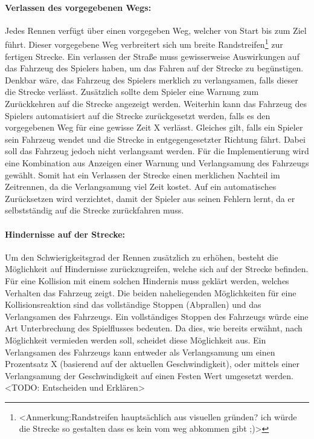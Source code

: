 		\paragraph{Verlassen des vorgegebenen Wegs:}
		Jedes Rennen verfügt über einen vorgegeben Weg, welcher von Start bis zum Ziel führt. Dieser vorgegebene Weg verbreitert sich um breite Randstreifen\footnote{<Anmerkung:Randstreifen hauptsächlich aus visuellen gründen? ich würde die Strecke so gestalten dass es kein vom weg abkommen gibt ;)>} zur fertigen Strecke. Ein verlassen der Straße muss gewisserweise Auswirkungen auf das Fahrzeug des Spielers haben, um das Fahren auf der Strecke zu begünstigen. Denkbar wäre, das Fahrzeug des Spielers merklich zu verlangsamen, falls dieser die Strecke verlässt. Zusätzlich sollte dem Spieler eine Warnung zum Zurückkehren auf die Strecke angezeigt werden. Weiterhin kann das Fahrzeug des Spielers automatisiert auf die Strecke zurückgesetzt werden, falls es den vorgegebenen Weg für eine gewisse Zeit X verlässt. Gleiches gilt, falls ein Spieler sein Fahrzeug wendet und die Strecke in entgegengesetzter Richtung fährt. Dabei soll das Fahrzeug jedoch nicht verlangsamt werden. Für die Implementierung wird eine Kombination aus Anzeigen einer Warnung und Verlangsamung des Fahrzeugs gewählt. Somit hat ein Verlassen der Strecke einen merklichen Nachteil im Zeitrennen, da die Verlangsamung viel Zeit kostet. Auf ein automatisches Zurücksetzen wird verzichtet, damit der Spieler aus seinen Fehlern lernt, da er selbstständig auf die Strecke zurückfahren muss.

		\paragraph{Hindernisse auf der Strecke:}
		Um den Schwierigkeitsgrad der Rennen zusätzlich zu erhöhen, besteht die Möglichkeit auf Hindernisse zurückzugreifen, welche sich auf der Strecke befinden. Für eine Kollision mit einem solchen Hindernis muss geklärt werden, welches Verhalten das Fahrzeug zeigt. Die beiden naheliegenden Möglichkeiten für eine Kollisionsreaktion sind das vollständige Stoppen (Abprallen) und das Verlangsamen des Fahrzeugs.
		Ein vollständiges Stoppen des Fahrzeugs würde eine Art Unterbrechung des Spielflusses bedeuten. Da dies, wie bereits erwähnt, nach Möglichkeit vermieden werden soll, scheidet diese Möglichkeit aus. Ein Verlangsamen des Fahrzeugs kann entweder als Verlangsamung um einen Prozentsatz X (basierend auf der aktuellen Geschwindigkeit), oder mittels einer Verlangsamung der Geschwindigkeit auf einen Festen Wert umgesetzt werden. <TODO: Entscheiden und Erklären>

